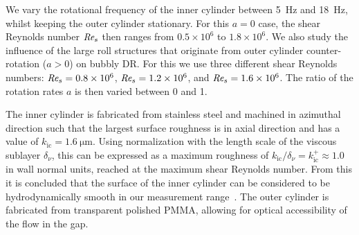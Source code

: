 \documentclass[aps,twocolumn,10pt,floatfix, superscriptaddress,longbibliography,pra]{revtex4-1}
\newcommand\Rey{\mbox{\textit{Re$_s$}}}  %
\newcommand{\e}[1]{\times 10^{#1}}
\begin{document}
We vary the rotational frequency of the inner cylinder between \SI{5}{Hz} and \SI{18}{Hz}, whilst keeping the outer cylinder stationary. For this $a = 0$ case, the shear Reynolds number $\Rey$ then ranges from $0.5\e6$ to $1.8\e6$. We also study the influence of the large roll structures that originate from outer cylinder counter-rotation ($a > 0$) on bubbly DR. For this we use three different shear Reynolds numbers: $\Rey = 0.8\e{6}$, $\Rey = 1.2\e{6}$, and $\Rey = 1.6\e{6}$. The ratio of the rotation rates $a$ is then varied between 0 and 1.

The inner cylinder is fabricated from stainless steel and machined in azimuthal direction such that the largest surface roughness is in axial direction and has a value of $k_\text{ic} = \SI{1.6}{\um}$. Using normalization with the length scale of the viscous sublayer $\delta_\nu$, this can be expressed as a maximum roughness of $k_\text{ic} / \delta_\nu = k^+_\text{ic} \approx 1.0$ in wall normal units, reached at the maximum shear Reynolds number. From this it is concluded that the surface of the inner cylinder can be considered to be hydrodynamically smooth in our measurement range~\citep{Schlichting}. The outer cylinder is fabricated from transparent polished PMMA, allowing for optical accessibility of the flow in the gap.
\end{document}
